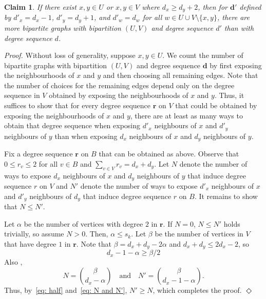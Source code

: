 \documentclass[11pt]{article}
\newenvironment{proofclaim}[1][]%
{\noindent \emph{Proof.} {}{#1}{}}{\hfill
	$\Diamond$\vspace{1em}}
\theoremstyle{plain}
\newtheorem{claim}{Claim}[thm]
\begin{document}
\begin{claim}\label{clm: iterative step}
    If there exist $x,y \in U$ or $x,y \in V$ where $d_x \geq d_y + 2$, then for $\mathbf d'$ defined by $d'_x = d_x - 1$, $d'_y = d_y + 1$, and $d'_w = d_w$ for all $w \in U\cup V \setminus \{x,y\}$, there are more bipartite graphs with bipartition $(U,V)$ and degree sequence $d'$ than with degree sequence $d$. 
\end{claim}
\begin{proofclaim}
    Without loss of generality, suppose $x,y \in U$.
    We count the number of bipartite graphs with bipartition $(U,V)$ and degree sequence $\mathbf d$ by first exposing the neighbourhoods of $x$ and $y$ and then choosing all remaining edges. Note that the number of choices for the remaining edges depend only on the degree sequence in $V$ obtained by exposing the neighbourhoods of $x$ and $y$. Thus, it suffices to show that for every degree sequence $\mathbf r$ on $V$ that could be obtained by exposing the neighbourhoods of $x$ and $y$, there are at least as many ways to obtain that degree sequence when exposing $d'_x$ neighbours of $x$ and $d'_y$ neighbours of $y$ than when exposing $d_x$ neighbours of $x$ and $d_y$ neighbours of $y$.

     Fix a degree sequence $\mathbf r$ on $B$ that can be obtained as above. Observe that $0 \leq r_v \leq 2$ for all $v \in B$ and $\sum_{v \in V} r_v = d_x + d_y$. Let $N$ denote the number of ways to expose $d_x$ neighbours of $x$ and $d_y$ neighbours of $y$ that induce degree sequence $r$ on $V$ and $N'$ denote the number of ways to expose $d'_x$ neighbours of $x$ and $d'_y$ neighbours of $d_y$ that induce degree sequence $r$ on $B$. It remains to show that $N \leq N'$. 

    Let $\alpha$ be the number of vertices with degree $2$ in $\mathbf r$. If $N = 0$, $N \leq N'$ holds trivially, so assume $N > 0$. Then, $\alpha \leq s_k$. Let $\beta$ be the number of vertices in $V$ that have degree $1$ in $\mathbf r$. Note that $\beta = d_x + d_y - 2\alpha$ and $d_x + d_y \leq 2d_x - 2$, so 
    \begin{equation}\label{eq: half}
        d_x - 1 - \alpha \geq \beta/2
    \end{equation}
    Also ,
    \begin{equation}\label{eq: N and N'}
        N = {\beta \choose d_x - \alpha} \quad \text{and} \quad N' = {\beta \choose d_x - 1 - \alpha}.
    \end{equation}
     Thus, by~\eqref{eq: half} and~\eqref{eq: N and N'}, $N' \geq N$, which completes the proof.
\end{proofclaim}
\end{document}
